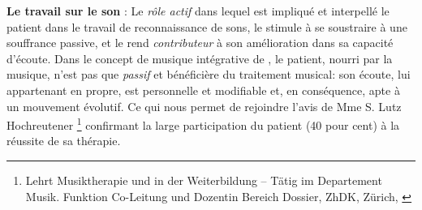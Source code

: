  \textbf{Le travail sur le son} :
 Le \emph{rôle actif} dans lequel est impliqué et interpellé le patient dans le travail
de reconnaissance de sons, le stimule à se soustraire à une souffrance
passive, et  le rend  \textit{contributeur} à son amélioration dans sa capacité
d'écoute.
Dans le concept de musique intégrative de \autocite[Cf.]
        {vrait_musicotherapie_2018}, le patient, nourri par
        la musique, n'est pas que \textit{passif }et
        bénéficière du traitement musical: son écoute, lui
        appartenant en propre, est personnelle et modifiable %
        et, en conséquence, apte à un mouvement évolutif.
Ce qui nous permet de rejoindre l'avis de Mme S. Lutz
 Hochreutener \footnote{ Lehrt Musiktherapie und in der Weiterbildung – Tätig
 im Departement Musik. Funktion Co-Leitung und Dozentin Bereich
  Dossier, ZhDK, Zürich, \autocite {lutz_hochreutener_spiel_2009} }
 confirmant la large participation du patient (40 pour cent) à la réussite de sa thérapie.

 
  


